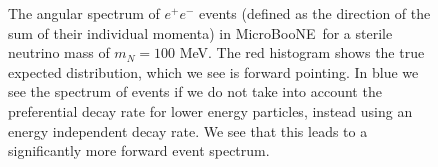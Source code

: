 \documentclass[11pt, a4paper]{article}
\def\muboone{MicroBooNE}
\def\ster{\ensuremath N}
\begin{document}
\begin{figure}[t]
%
\center
%
\Large

\resizebox{0.8\columnwidth}{!}{}
%
\caption{\label{fig:spectrum_ee_angular} The angular spectrum of $e^+e^-$
events (defined as the direction of the sum of their individual momenta) in
\muboone\ for a sterile neutrino mass of $m_N = 100$ MeV. The red histogram
shows the true expected distribution, which we see is forward pointing. In blue
we see the spectrum of events if we do not take into account the preferential
decay rate for lower energy particles, instead using an energy independent
decay rate. We see that this leads to a significantly more forward event 
spectrum.}
%
\end{figure}
 
% 
%
%
\end{document}
